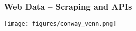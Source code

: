 \documentclass{beamer}
\begin{document}
	

  

\begin{frame}
	\frametitle{Web Data -- Scraping and APIs}
	\pause 
	\texttt{[image: figures/conway\_venn.png]} \\
\end{frame}
\end{document}
